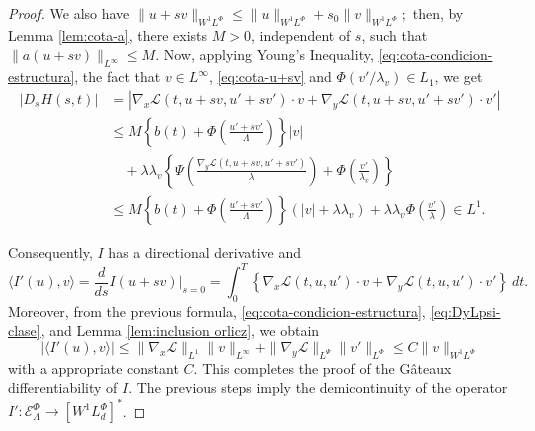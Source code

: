 \documentclass[twoside]{article}
\theoremstyle{remark}
\newcommand{\orlnor}{\|_{L^{\Phi}}}
\newcommand{\linf}{\|_{L^{\infty}}}
\newcommand{\lphi}{L^{\Phi}}
\newcommand{\lpsi}{L^{\Psi}}
\newcommand{\wphi}{W^{1}\lphi}
\newcommand{\sobnor}{\|_{W^{1}\lphi}}
\newcommand{\domi}{\mathcal{E}^{\Phi}}
\renewcommand{\leq}{\leqslant}
\begin{document}
\begin{proof}
We also have
$
\|u+sv\sobnor\leq \|u\sobnor+s_0\|v\sobnor;
$
then, by Lemma \ref{lem:cota-a}, there exists $M>0$, independent of $s$, such that
$\|a(u+sv)\linf\leq M$. Now, applying Young's Inequality,  \eqref{eq:cota-condicion-estructura},
the fact that $v \in L^{\infty}$, \eqref{eq:cota-u+sv} and $\Phi(v'/\lambda_v)\in L_1$, 
we get
\begin{equation}\label{ctg}
\begin{split}
|D_s H(s,t)|&=\left| \nabla_x\mathcal{L}(t,u+sv,u'+sv')\cdot v +
  \nabla_y\mathcal{L}(t, u+s v, u'+sv')\cdot v'\right| \\
  & \leq M \left\{ b(t)+ \Phi\left(\frac{u'+sv'}{\Lambda}\right)\right\}|v|\\
 &\quad+ \lambda\lambda_v\left\{\Psi\left(\frac{\nabla_y\mathcal{L}(t,u+sv,u'+sv')}{\lambda}\right)+\Phi\left(\frac{v'}{\lambda_v}\right) \right\}
\\
 &\leq 
 M \left\{ b(t)+ \Phi\left(\frac{u'+sv'}{\Lambda}\right)\right\} (|v|+\lambda\lambda_v) +\lambda\lambda_v \Phi\left(\frac{v'}{\lambda}\right)
 \in L^1.
\end{split}
\end{equation}

Consequently, $I$ has a directional derivative and
\[
\langle I'(u),v \rangle=\frac{d}{ds}I(u+s v)\big|_{s=0}=\int_0^T  
\left\{\nabla_x\mathcal{L}(t,u,u')\cdot v+ \nabla_y\mathcal{L}(t,u,u')\cdot v'\right\} \ dt.
\]
Moreover, from the previous formula, \eqref{eq:cota-condicion-estructura},  \eqref{eq:DyLpsi-clase}, and
Lemma \ref{lem:inclusion orlicz}, we obtain
\[
|\langle I'(u),v \rangle| \leq \|\nabla_x\mathcal{L}\|_{L^1} \| v\linf + 
\|\nabla_y\mathcal{L}\|_{\lpsi} \|v'\orlnor \leq C \|v\sobnor
\]
with a appropriate constant $C$.
This completes the proof of the G\^ateaux differentiability of $I$. 
The previous steps imply the demicontinuity of the operator $I':\domi_{\Lambda}  \to \left[\wphi_d
\right]^* $.



\end{proof}
\end{document}
